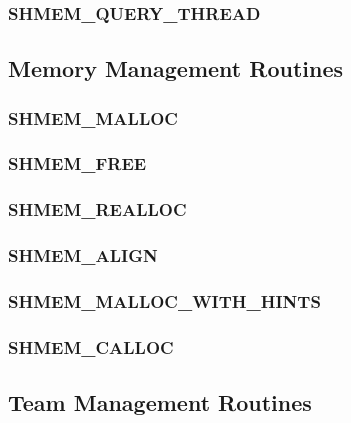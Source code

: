 \documentclass[10pt,oneside]{book}
\begin{document}
\subsubsection{\textbf{SHMEM\_QUERY\_THREAD}}
\label{subsec:shmem_query_thread}


\subsection{Memory Management Routines}
\label{sec:memory_management}


\subsubsection{\textbf{SHMEM\_MALLOC}}\label{subsec:shmem_malloc}


\subsubsection{\textbf{SHMEM\_FREE}}\label{subsec:shmem_free}


\subsubsection{\textbf{SHMEM\_REALLOC}}\label{subsec:shmem_realloc}


\subsubsection{\textbf{SHMEM\_ALIGN}}\label{subsec:shmem_align}


\subsubsection{\textbf{SHMEM\_MALLOC\_WITH\_HINTS}}\label{subsec:shmmallochint}


\subsubsection{\textbf{SHMEM\_CALLOC}}\label{subsec:shmem_calloc}




\subsection{Team Management Routines}\label{subsec:team}

\end{document}
